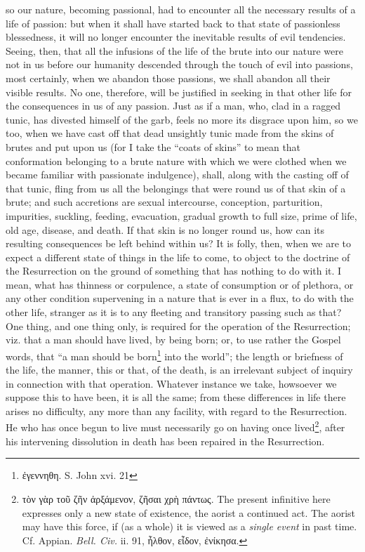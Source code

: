so our nature, becoming passional, had to encounter all the necessary results of a life of passion: but when it shall have started back to that state of passionless blessedness, it will no longer encounter the inevitable results of evil tendencies. Seeing, then, that all the infusions of the life of the brute into our nature were not in us before our humanity descended through the touch of evil into passions, most certainly, when we abandon those passions, we shall abandon all their visible results. No one, therefore, will be justified in seeking in that other life for the consequences in us of any passion. Just as if a man, who, clad in a ragged tunic, has divested himself of the garb, feels no more its disgrace upon him, so we too, when we have cast off that dead unsightly tunic made from the skins of brutes and put upon us (for I take the “coats of skins” to mean that conformation belonging to a brute nature with which we were clothed when we became familiar with passionate indulgence), shall, along with the casting off of that tunic, fling from us all the belongings that were round us of that skin of a brute; and such accretions are sexual intercourse, conception, parturition, impurities, suckling, feeding, evacuation, gradual growth to full size, prime of life, old age, disease, and death. If that skin is no longer round us, how can its resulting consequences be left behind within us? It is folly, then, when we are to expect a different state of things in the life to come, to object to the doctrine of the Resurrection on the ground of something that has nothing to do with it. I mean, what has thinness or corpulence, a state of consumption or of plethora, or any other condition supervening in a nature that is ever in a flux, to do with the other life, stranger as it is to any fleeting and transitory passing such as that? One thing, and one thing only, is required for the operation of the Resurrection; viz. that a man should have lived, by being born; or, to use rather the Gospel words, that “a man should be born\footnote{\textgreek{ἐγεννηθη}. S. John xvi. 21} into the world”; the length or briefness of the life, the manner, this or that, of the death, is an irrelevant subject of inquiry in connection with that operation. Whatever instance we take, howsoever we suppose this to have been, it is all the same; from these differences in life there arises no difficulty, any more than any facility, with regard to the Resurrection. He who has once begun to live must necessarily go on having once lived\footnote{\textgreek{τὸν γὰρ τοῦ ζῆν ἀρξάμενον, ζῆσαι χρὴ πάντως}. The present infinitive here expresses only a new state of existence, the aorist a continued act. The aorist may have this force, if (as a whole) it is viewed as a \emph{single event} in past time. Cf. Appian. \emph{Bell. Civ.} ii. 91, \textgreek{ἦλθον, εἶδον, ἐνίκησα}.}, after his intervening dissolution in death has been repaired in the Resurrection.

